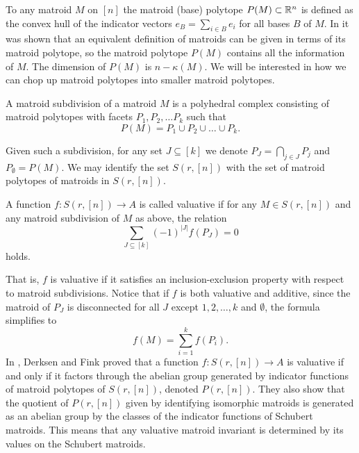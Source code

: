 To any matroid $M$ on $[n]$ the matroid (base) polytope $P(M) \subset {\mathbb R}^n$ is defined as the convex hull of the indicator vectors $e_B = \sum_{i\in B}e_i$ for all bases $B$ of $M$. In \cite{Gel} it was shown that an equivalent definition of matroids can be given in terms of its matroid polytope, so the matroid polytope $P(M)$ contains all the information of $M$. The dimension of $P(M)$ is $n - \kappa(M)$. We will be interested in how we can chop up matroid polytopes into smaller matroid polytopes.
\begin{definition}
    A matroid subdivision of a matroid $M$ is a polyhedral complex consisting of matroid polytopes with facets $P_1, P_2, \dots P_k$ such that 
    \begin{equation*}
        P(M) = P_1 \cup P_2 \cup \dots \cup P_k.
    \end{equation*}
\end{definition}

Given such a subdivision, for any set $J \subseteq [k]$ we denote $P_J = \bigcap_{j\in J}P_j$ and $P_\emptyset = P(M)$.
We may identify the set $S(r,[n])$ with the set of matroid polytopes of matroids in $S(r,[n])$.

\begin{definition}
    A function $f\colon S(r,[n]) \to A$ is called valuative if for any $M \in S(r,[n])$ and any matroid subdivision of $M$ as above, the relation
    \begin{equation*}
        \sum_{J\subseteq [k]} (-1)^{|J|}f(P_J) = 0
    \end{equation*}
    holds.
\end{definition}
That is, $f$ is valuative if it satisfies an inclusion-exclusion property with respect to matroid subdivisions. Notice that if $f$ is both valuative and additive, since the matroid of $P_J$ is disconnected for all $J$ except $1,2, \dots , k$ and $\emptyset$, the formula simplifies to
\begin{equation*}
    f(M) = \sum_{i=1}^k f(P_i).
\end{equation*}
 In \cite{DerksenFink}, Derksen and Fink proved that a function $f\colon S(r,[n]) \to A$ is valuative if and only if it factors through the abelian group generated by indicator functions of matroid polytopes of $S(r,[n])$, denoted $P(r,[n])$. They also show that the quotient of $P(r,[n])$ given by identifying isomorphic matroids is generated as an abelian group by the classes of the indicator functions of Schubert matroids. This means that any valuative matroid invariant is determined by its values on the Schubert matroids. 

